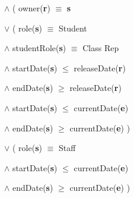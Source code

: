 \documentclass[a4paper,11pt]{article}
\begin{document}
\hspace{2.2cm}$\wedge{}$ ( owner(\textbf{r}) $\equiv$ \textbf{s}\par
\hspace{2.9cm}$\vee{}$ ( role(\textbf{s}) $\equiv$ Student\par
\hspace{3.5cm}$\wedge{}$ studentRole(\textbf{s}) $\equiv$ Class Rep\par
\hspace{3.5cm}$\wedge{}$ startDate(\textbf{s}) $\leq$ releaseDate(\textbf{r})\par
\hspace{3.5cm}$\wedge{}$ endDate(\textbf{s}) $\geq$ releaseDate(\textbf{r})\par
\hspace{3.5cm}$\wedge{}$ startDate(\textbf{s}) $\leq$ currentDate(\textbf{e})\par
\hspace{3.5cm}$\wedge{}$ endDate(\textbf{s}) $\geq$ currentDate(\textbf{e}) )\par
\hspace{2.9cm}$\vee{}$ ( role(\textbf{s}) $\equiv$ Staff\par
\hspace{3.5cm}$\wedge{}$ startDate(\textbf{s}) $\leq$ currentDate(\textbf{e})\par
\hspace{3.5cm}$\wedge{}$ endDate(\textbf{s}) $\geq$ currentDate(\textbf{e}) )\par
\end{document}
